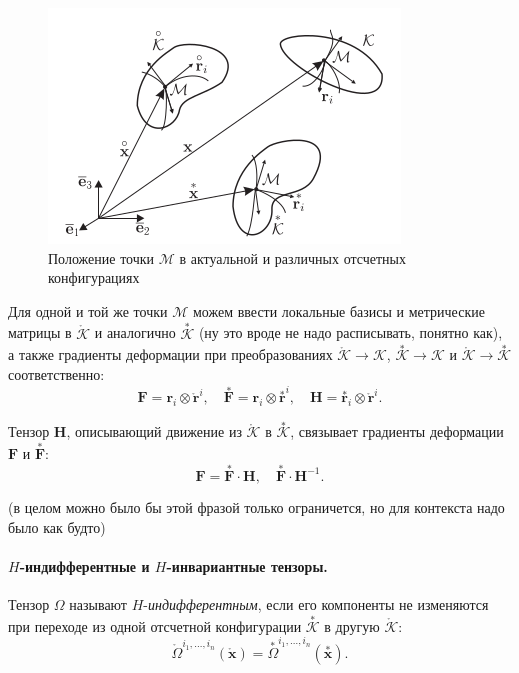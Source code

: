 \begin{figure}[H]
	\centering
	\includegraphics[width=0.6\linewidth]{img/que31}
	\caption{Положение точки $\mathcal{M}$ в актуальной и различных отсчетных конфигурациях}
	\label{fig:que31}
\end{figure}

Для одной и той же точки $\mathcal{M}$ можем ввести локальные базисы и метрические матрицы в $\mathring{\mathcal{K}}$ и аналогично  $\overset{\ast}{\mathcal{K}}$ (ну это вроде не надо расписывать, понятно как), а также градиенты деформации при преобразованиях $\mathring{\mathcal{K}} \to \mathcal{K}$, $\overset{\ast}{\mathcal{K}} \to \mathcal{K}$ и $\mathring{\mathcal{K}} \to \overset{\ast}{\mathcal{K}}$ соответственно:
\begin{equation*}
	\mathbf{F} = \mathbf{r}_i \otimes \mathring{\mathbf{r}}^i, \quad \overset{\ast}{\mathbf{F}} = \mathbf{r}_i \otimes \overset{\ast}{\mathbf{r}}^i, \quad \mathbf{H} = \overset{\ast}{\mathbf{r}}_i \otimes \mathring{\mathbf{r}}^i.
\end{equation*}

Тензор $\mathbf{H}$, описывающий движение из $\mathring{\mathcal{K}}$ в $\overset{\ast}{\mathcal{K}}$, связывает градиенты деформации $\mathbf{F}$ и $\overset{\ast}{\mathbf{F}}$: 
\begin{equation*}
	\mathbf{F} = \overset{\ast}{\mathbf{F}} \cdot \mathbf{H}, \quad \overset{\ast}{\mathbf{F}} \cdot \mathbf{H}^{-1}.
\end{equation*}

(в целом можно было бы этой фразой только ограничется, но для контекста надо было как будто)

\paragraph{$H$-индифферентные и $H$-инвариантные тензоры.} 
\begin{definition*}
	Тензор $\Omega$ называют $H$-\textit{индифферентным}, если его компоненты не изменяются при переходе из одной отсчетной конфигурации $\overset{\ast}{\mathcal{K}}$ в другую $\mathring{\mathcal{K}}$:
	\begin{equation*}
		\mathring{\Omega}^{i_1, \dotsc, i_n}(\mathring{\mathbf{x}}) = \overset{\ast}{\Omega}^{i_1, \dotsc, i_n}(\overset{\ast}{\mathbf{x}}).
	\end{equation*}
\end{definition*}

